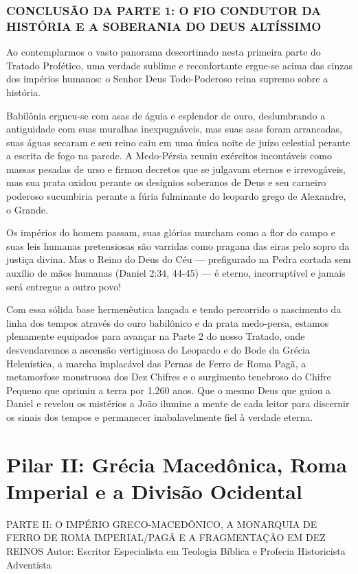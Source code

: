 \documentclass[11pt,a4paper,openany]{book}
\begin{document}
\subsection{CONCLUSÃO DA PARTE 1: O FIO CONDUTOR DA HISTÓRIA E A SOBERANIA DO DEUS ALTÍSSIMO}


Ao contemplarmos o vasto panorama descortinado nesta primeira parte do Tratado Profético, uma verdade sublime e reconfortante ergue-se acima das cinzas dos impérios humanos: o Senhor Deus Todo-Poderoso reina supremo sobre a história.

Babilônia ergueu-se com asas de águia e esplendor de ouro, deslumbrando a antiguidade com suas muralhas inexpugnáveis, mas suas asas foram arrancadas, suas águas secaram e seu reino caiu em uma única noite de juízo celestial perante a escrita de fogo na parede. A Medo-Pérsia reuniu exércitos incontáveis como massas pesadas de urso e firmou decretos que se julgavam eternos e irrevogáveis, mas sua prata oxidou perante os desígnios soberanos de Deus e seu carneiro poderoso sucumbiria perante a fúria fulminante do leopardo grego de Alexandre, o Grande.

Os impérios do homem passam, suas glórias murcham como a flor do campo e suas leis humanas pretensiosas são varridas como pragana das eiras pelo sopro da justiça divina. Mas o Reino do Deus do Céu — prefigurado na Pedra cortada sem auxílio de mãos humanas (Daniel 2:34, 44-45) — é eterno, incorruptível e jamais será entregue a outro povo!

Com essa sólida base hermenêutica lançada e tendo percorrido o nascimento da linha dos tempos através do ouro babilônico e da prata medo-persa, estamos plenamente equipados para avançar na Parte 2 do nosso Tratado, onde desvendaremos a ascensão vertiginosa do Leopardo e do Bode da Grécia Helenística, a marcha implacável das Pernas de Ferro de Roma Pagã, a metamorfose monstruosa dos Dez Chifres e o surgimento tenebroso do Chifre Pequeno que oprimiu a terra por 1.260 anos. Que o mesmo Deus que guiou a Daniel e revelou os mistérios a João ilumine a mente de cada leitor para discernir os sinais dos tempos e permanecer inabalavelmente fiel à verdade eterna.

\chapter{Pilar II: Grécia Macedônica, Roma Imperial e a Divisão Ocidental}

PARTE II: O IMPÉRIO GRECO-MACEDÔNICO, A MONARQUIA DE FERRO DE ROMA IMPERIAL/PAGÃ E A FRAGMENTAÇÃO EM DEZ REINOS
Autor: Escritor Especialista em Teologia Bíblica e Profecia Historicista Adventista
\end{document}
